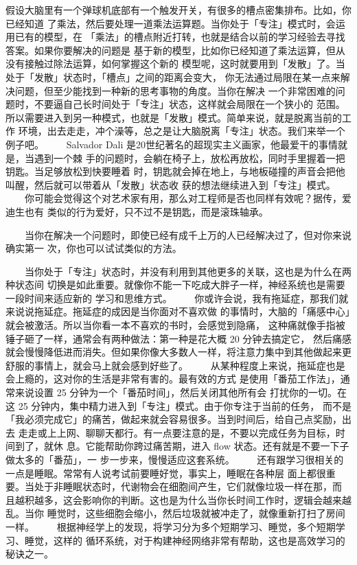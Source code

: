 \documentclass[11pt]{ctexart}
\begin{document}
{{{{假设大脑里有一个弹球机底部有一个触发开关，有很多的槽点密集排布。比如，你已经知道
了乘法，然后要处理一道乘法运算题。当你处于「专注」模式时，会运用已有的模型，在
「乘法」的槽点附近打转，也就是结合以前的学习经验去寻找答案。如果你要解决的问题是
基于新的模型，比如你已经知道了乘法运算，但从没有接触过除法运算，如何掌握这个新的
模型呢，这时就要用到「发散」了。当处于「发散」状态时，「槽点」之间的距离会变大，
你无法通过局限在某一点来解决问题，但至少能找到一种新的思考事物的角度。当你在解决
一个非常困难的问题时，不要逼自己长时间处于「专注」状态，这样就会局限在一个狭小的
范围。所以需要进入到另一种模式，也就是「发散」模式。简单来说，就是脱离当前的工作
环境，出去走走，冲个澡等，总之是让大脑脱离「专注」状态。我们来举一个例子吧。
　　Salvador Dali 是20世纪著名的超现实主义画家，他最爱干的事情就是，当遇到一个棘
手的问题时，会躺在椅子上，放松再放松，同时手里握着一把钥匙。当足够放松到快要睡着
时，钥匙就会掉在地上，与地板碰撞的声音会把他叫醒，然后就可以带着从「发散」状态收
获的想法继续进入到「专注」模式。
　　你可能会觉得这个对艺术家有用，那么对工程师是否也同样有效呢？据传，爱迪生也有
类似的行为爱好，只不过不是钥匙，而是滚珠轴承。

　　当你在解决一个问题时，即使已经有成千上万的人已经解决过了，但对你来说确实第一
次，你也可以试试类似的方法。

　　当你处于「专注」状态时，并没有利用到其他更多的关联，这也是为什么在两种状态间
切换是如此重要。就像你不能一下吃成大胖子一样，神经系统也是需要一段时间来适应新的
学习和思维方式。
　　你或许会说，我有拖延症，那我们就来说说拖延症。拖延症的成因是当你面对不喜欢做
的事情时，大脑的「痛感中心」就会被激活。所以当你看一本不喜欢的书时，会感觉到隐痛，
这种痛就像手指被锤子砸了一样，通常会有两种做法：第一种是花大概 20 分钟去搞定它，
然后痛感就会慢慢降低进而消失。但如果你像大多数人一样，将注意力集中到其他做起来更
舒服的事情上，就会马上就会感到好些了。
　　从某种程度上来说，拖延症也是会上瘾的，这对你的生活是非常有害的。最有效的方式
是使用「番茄工作法」，通常来说设置 25 分钟为一个「番茄时间」，然后关闭其他所有会
打扰你的一切。在这 25 分钟内，集中精力进入到「专注」模式。由于你专注于当前的任务，
而不是「我必须完成它」的痛苦，做起来就会容易很多。当到时间后，给自己点奖励，出去
走走或上上网、聊聊天都行。有一点要注意的是，不要以完成任务为目标，时间到了，就休
息。它能帮助你跨过痛苦期，进入 flow 状态。还有就是不要一下子做太多的「番茄」，一
步一步来，慢慢适应这套系统。
　　还有跟学习很相关的一点是睡眠。常常有人说考试前要睡好觉，事实上，睡眠在各种层
面上都很重要。当处于非睡眠状态时，代谢物会在细胞间产生，它们就像垃圾一样在那，而
且越积越多，这会影响你的判断。这也是为什么当你长时间工作时，逻辑会越来越乱。当你
睡觉时，这些细胞会缩小，然后垃圾就被冲走了，就像重新打扫了房间一样。
　　根据神经学上的发现，将学习分为多个短期学习、睡觉，多个短期学习、睡觉，这样的
循环系统，对于构建神经网络非常有帮助，这也是高效学习的秘诀之一。

}}}}
\end{document}
